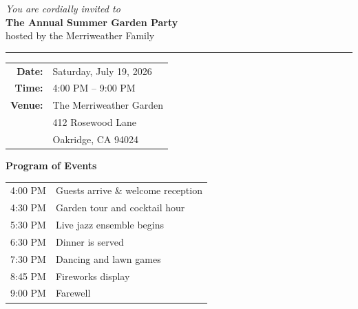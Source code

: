 \documentclass[
    language=english,
    doctype=invitation,
    institution=none,
]{../../omnilatex}
\begin{document}
\begin{center}
    \vspace*{1cm}

    {\Large\itshape You are cordially invited to}\\[0.8em]
    {\Huge\bfseries The Annual Summer Garden Party}\\[0.8em]
    {\large hosted by the Merriweather Family}

    \vspace{1.5em}
    \noindent\rule{0.5\textwidth}{0.4pt}
    \vspace{1.5em}
\end{center}

\begin{center}
    \begin{tabular}{rl}
        \textbf{Date:}     & Saturday, July 19, 2026 \\
        \textbf{Time:}     & 4:00 PM -- 9:00 PM \\
        \textbf{Venue:}    & The Merriweather Garden \\
                           & 412 Rosewood Lane \\
                           & Oakridge, CA 94024 \\
    \end{tabular}
\end{center}

\vspace{1.5em}

\begin{center}
    {\large\bfseries Program of Events}
\end{center}

\begin{center}
    \begin{tabular}{rl}
        4:00 PM  & Guests arrive \& welcome reception \\
        4:30 PM  & Garden tour and cocktail hour \\
        5:30 PM  & Live jazz ensemble begins \\
        6:30 PM  & Dinner is served \\
        7:30 PM  & Dancing and lawn games \\
        8:45 PM  & Fireworks display \\
        9:00 PM  & Farewell \\
    \end{tabular}
\end{center}

\vspace{1.5em}
\end{document}

